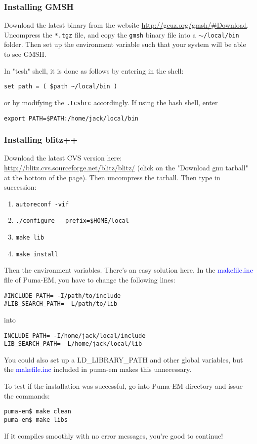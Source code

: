 \documentclass[a4paper,10pt]{book}
\newcommand{\file}[1] {\textcolor{blue}{\textsf{#1}}}
\begin{document}
\subsubsection{Installing GMSH}
%
\par
Download the latest binary from the website \url{http://geuz.org/gmsh/#Download}. Uncompress the \texttt{*.tgz} file, and copy the \texttt{gmsh} binary file into a \texttt{$\sim$/local/bin} folder. Then set up the environment variable such that your system will be able to see GMSH.
%
\par
In "tcsh" shell, it is done as follows by entering in the shell:
\begin{verbatim}
set path = ( $path ~/local/bin )
\end{verbatim}
or by modifying the \texttt{.tcshrc} accordingly. If using the bash shell, enter 
\begin{verbatim}
export PATH=$PATH:/home/jack/local/bin
\end{verbatim}

\subsubsection{Installing blitz++}
\label{subsec:blitz_install}
%
\par
Download the latest CVS version here: \url{http://blitz.cvs.sourceforge.net/blitz/blitz/} (click on the "Download gnu tarball" at the bottom of the page). Then uncompress the tarball. Then type in succession:
\begin{enumerate}
\item \texttt{autoreconf -vif}
\item \texttt{./configure -{}-prefix=\$HOME/local}
\item \texttt{make lib}
\item \texttt{make install}
\end{enumerate}
%
\par
Then the environment variables. There's an easy solution here. In the \file{makefile.inc} file of Puma-EM, you have to change the following lines:
\begin{verbatim}
#INCLUDE_PATH= -I/path/to/include
#LIB_SEARCH_PATH= -L/path/to/lib
\end{verbatim}
into
\begin{verbatim}
INCLUDE_PATH= -I/home/jack/local/include
LIB_SEARCH_PATH= -L/home/jack/local/lib
\end{verbatim}
%
\par
You could also set up a LD\_LIBRARY\_PATH and other global variables, but the \file{makefile.inc} included in puma-em makes this unnecessary. 
%
\par
To test if the installation was successful, go into Puma-EM directory and issue the commands:
\begin{verbatim}
puma-em$ make clean
puma-em$ make libs
\end{verbatim}
If it compiles smoothly with no error messages, you're good to continue!
\end{document}
